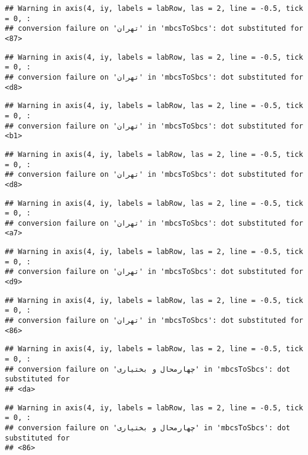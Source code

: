 \documentclass[
]{article}
\begin{document}
\begin{verbatim}
## Warning in axis(4, iy, labels = labRow, las = 2, line = -0.5, tick = 0, :
## conversion failure on 'تهران' in 'mbcsToSbcs': dot substituted for <87>
\end{verbatim}

\begin{verbatim}
## Warning in axis(4, iy, labels = labRow, las = 2, line = -0.5, tick = 0, :
## conversion failure on 'تهران' in 'mbcsToSbcs': dot substituted for <d8>
\end{verbatim}

\begin{verbatim}
## Warning in axis(4, iy, labels = labRow, las = 2, line = -0.5, tick = 0, :
## conversion failure on 'تهران' in 'mbcsToSbcs': dot substituted for <b1>
\end{verbatim}

\begin{verbatim}
## Warning in axis(4, iy, labels = labRow, las = 2, line = -0.5, tick = 0, :
## conversion failure on 'تهران' in 'mbcsToSbcs': dot substituted for <d8>
\end{verbatim}

\begin{verbatim}
## Warning in axis(4, iy, labels = labRow, las = 2, line = -0.5, tick = 0, :
## conversion failure on 'تهران' in 'mbcsToSbcs': dot substituted for <a7>
\end{verbatim}

\begin{verbatim}
## Warning in axis(4, iy, labels = labRow, las = 2, line = -0.5, tick = 0, :
## conversion failure on 'تهران' in 'mbcsToSbcs': dot substituted for <d9>
\end{verbatim}

\begin{verbatim}
## Warning in axis(4, iy, labels = labRow, las = 2, line = -0.5, tick = 0, :
## conversion failure on 'تهران' in 'mbcsToSbcs': dot substituted for <86>
\end{verbatim}

\begin{verbatim}
## Warning in axis(4, iy, labels = labRow, las = 2, line = -0.5, tick = 0, :
## conversion failure on 'چهارمحال و بختیاری' in 'mbcsToSbcs': dot substituted for
## <da>
\end{verbatim}

\begin{verbatim}
## Warning in axis(4, iy, labels = labRow, las = 2, line = -0.5, tick = 0, :
## conversion failure on 'چهارمحال و بختیاری' in 'mbcsToSbcs': dot substituted for
## <86>
\end{verbatim}
\end{document}
